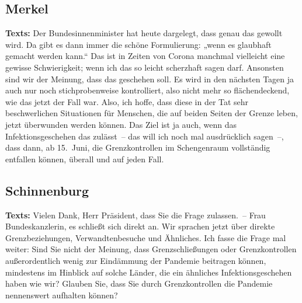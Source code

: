 \documentclass{article}
\begin{document}
\subsection{Merkel}
\noindent\textbf{Texts:} Der Bundesinnenminister hat heute dargelegt, dass genau das gewollt wird. Da gibt es dann immer die schöne Formulierung: „wenn es glaubhaft gemacht werden kann.“ Das ist in Zeiten von Corona manchmal vielleicht eine gewisse Schwierigkeit; wenn ich das so leicht scherzhaft sagen darf. Ansonsten sind wir der Meinung, dass das geschehen soll. Es wird in den nächsten Tagen ja auch nur noch stichprobenweise kontrolliert, also nicht mehr so flächendeckend, wie das jetzt der Fall war. Also, ich hoffe, dass diese in der Tat sehr beschwerlichen Situationen für Menschen, die auf beiden Seiten der Grenze leben, jetzt überwunden werden können. Das Ziel ist ja auch, wenn das Infektionsgeschehen das zulässt – das will ich noch mal ausdrücklich sagen –, dass dann, ab 15. Juni, die Grenzkontrollen im Schengenraum vollständig entfallen können, überall und auf jeden Fall.

\subsection{Schinnenburg}
\noindent\textbf{Texts:} Vielen Dank, Herr Präsident, dass Sie die Frage zulassen. – Frau Bundeskanzlerin, es schließt sich direkt an. Wir sprachen jetzt über direkte Grenzbeziehungen, Verwandtenbesuche und Ähnliches. Ich fasse die Frage mal weiter: Sind Sie nicht der Meinung, dass Grenzschließungen oder Grenzkontrollen außerordentlich wenig zur Eindämmung der Pandemie beitragen können, mindestens im Hinblick auf solche Länder, die ein ähnliches Infektionsgeschehen haben wie wir? Glauben Sie, dass Sie durch Grenzkontrollen die Pandemie nennenswert aufhalten können?
\end{document}
